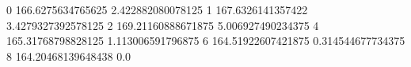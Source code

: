 0 166.6275634765625 2.422882080078125
1 167.6326141357422 3.4279327392578125
2 169.21160888671875 5.006927490234375
4 165.31768798828125 1.113006591796875
6 164.51922607421875 0.314544677734375
8 164.20468139648438 0.0
